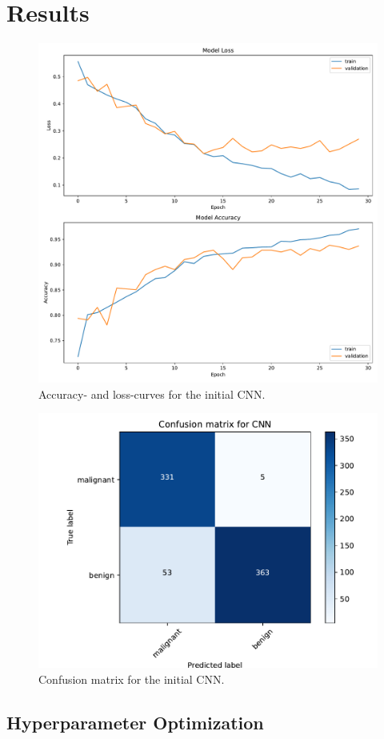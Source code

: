 \chapter{Results}
\label{sec:results}



\begin{figure}[H]
    \centering
    \includegraphics[width=.7\textwidth]{plots/CNN_history.pdf}
    \caption{Accuracy- and loss-curves for the initial CNN.}
    \label{fig:learningCurveInitial}
\end{figure}


\begin{figure}[H]
    \centering
    \includegraphics[width=.5\textwidth]{plots/confusion_matrix_CNN.pdf}
    \caption{Confusion matrix for the initial CNN.}
    \label{fig:confusionMatrixInitial}
\end{figure}



\section{Hyperparameter Optimization}
\label{sec:hyperparameter}



